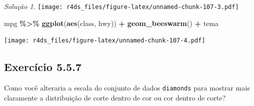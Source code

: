 \documentclass[
]{latex/krantz}
\newenvironment{Shaded}{\begin{snugshade}}{\end{snugshade}}
\newcommand{\FunctionTok}[1]{\textcolor[rgb]{0.13,0.29,0.53}{\textbf{#1}}}
\newcommand{\NormalTok}[1]{#1}
\newcommand{\SpecialCharTok}[1]{\textcolor[rgb]{0.81,0.36,0.00}{\textbf{#1}}}
\theoremstyle{definition}
\theoremstyle{definition}
\theoremstyle{definition}
\theoremstyle{definition}
\theoremstyle{remark}
\newtheorem*{solution}{Solução}
\begin{document}
\begin{solution}
\texttt{[image: r4ds\_files/figure-latex/unnamed-chunk-107-3.pdf]}

\begin{Shaded}
\begin{Highlighting}[]
\NormalTok{mpg }\SpecialCharTok{\%\textgreater{}\%}
    \FunctionTok{ggplot}\NormalTok{(}\FunctionTok{aes}\NormalTok{(class, hwy)) }\SpecialCharTok{+}
        \FunctionTok{geom\_beeswarm}\NormalTok{() }\SpecialCharTok{+}
\NormalTok{        tema}
\end{Highlighting}
\end{Shaded}

\texttt{[image: r4ds\_files/figure-latex/unnamed-chunk-107-4.pdf]}
\end{solution}

\hypertarget{exr5-7-7}{%
\subsection*{Exercício 5.5.7}\label{exr5-7-7}}

Como você alteraria a escala do conjunto de dados \texttt{diamonds} para mostrar mais claramente a distribuição de corte dentro de cor ou cor dentro de corte?
\end{document}
